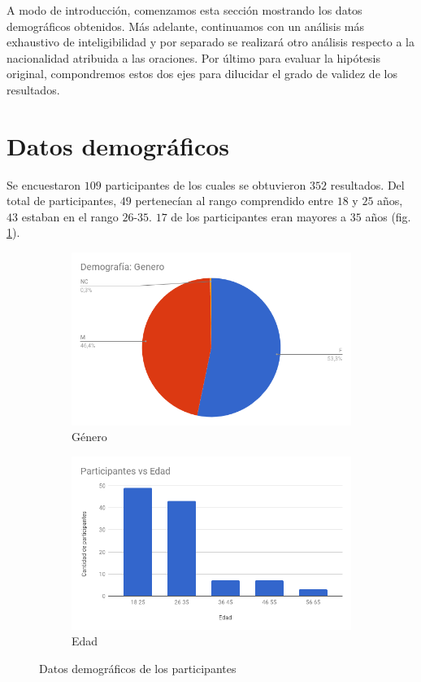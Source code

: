 
A modo de introducción, comenzamos esta sección mostrando los datos demográficos obtenidos. Más adelante, continuamos con un análisis más exhaustivo de inteligibilidad y por separado se realizará otro análisis respecto a la nacionalidad atribuida a las oraciones. Por último para evaluar la hipótesis original, compondremos estos dos ejes para dilucidar el grado de validez de los resultados.

\section{Datos demográficos}

Se encuestaron $109$ participantes de los cuales se obtuvieron $352$ resultados. Del total de participantes, $49$ pertenecían al rango comprendido entre $18$ y $25$ años, $43$ estaban en el rango $26$-$35$. $17$ de los participantes eran mayores a $35$ años (fig. \ref{genero}).

\begin{figure}
\centering
\begin{subfigure}{.5\textwidth}
  \centering
	\includegraphics[width=1\linewidth]{datosDemograficos/genero.png}
  \caption{Género}
  \label{genero}
\end{subfigure}%
\begin{subfigure}{.5\textwidth}
  \centering
	\includegraphics[width=1\linewidth]{datosDemograficos/edad.png}
  \caption{Edad}
  \label{fig:sub2}
\end{subfigure}
\caption{Datos demográficos de los participantes}
\label{edad}
\end{figure}

